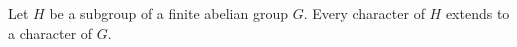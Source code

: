 Let $H$ be a subgroup of a finite abelian group $G$. Every character of $H$ extends to a character of $G$.
